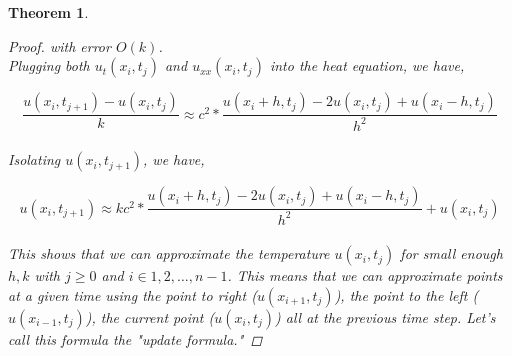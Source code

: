 \documentclass[12pt,letterpaper,reqno]{amsart}
\newtheorem{thm}{Theorem}
\theoremstyle{definition}
\numberwithin{thm}{section}
\theoremstyle{remark}
\begin{document}
\begin{thm}
\begin{proof}
with error $O(k)$.\\

Plugging both $u_{t}(x_i,t_j)$ and $u_{xx}(x_i,t_j)$ into the heat equation, we have,

\[
\frac{u(x_i,t_{j+1}) - u(x_i,t_{j})}{k} \approx c^2 *\frac{u(x_i+h,t_j)-2u(x_i,t_j)+u(x_i-h,t_j)}{h^2}
\]\\

Isolating $u(x_i,t_{j+1})$, we have,
 
 \[
u(x_i,t_{j+1})  \approx kc^2 * \frac{u(x_i+h,t_j)-2u(x_i,t_j)+u(x_i-h,t_j)}{h^2} + u(x_i,t_{j})
 \]\\

This shows that we can approximate the temperature $u(x_i, t_j)$ for small enough $h, k$ with $j \ge 0$ and $i \in {1, 2, \dots, n-1}$. This means that we can approximate points at a given time using the point to right ($u(x_{i+1},t_{j})$), the point to the left ($u(x_{i-1},t_{j})$), the current point ($u(x_{i},t_{j})$) all at the previous time step. Let's call this formula the "update formula." \end{proof}
\end{thm}
\end{document}
